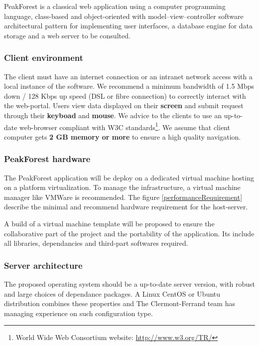 PeakForest is a classical web application using a computer programming language, class-based and object-oriented with model–view–controller software architectural pattern for implementing user interfaces, a database engine for data storage and a web server to be consulted.


\subsubsection{Client environment}

The client must have an internet connection or an intranet network access with a local instance of the software. We recommend a minimum bandwidth of 1.5 Mbps down / 128 Kbps up speed (DSL or fibre connection) to correctly interact with the web-portal. Users view data displayed on their \textbf{screen} and submit request through their \textbf{keyboad} and \textbf{mouse}.
We advice to the clients to use an up-to-date web-browser compliant with W3C standards\footnote{World Wide Web Consortium website: \url{http://www.w3.org/TR/}}. We assume that client computer gets \textbf{2 GB memory or more} to ensure a high quality navigation.\\


\subsubsection{PeakForest hardware}

The PeakForest application will be deploy on a dedicated virtual machine hosting on a platform virtualization. To manage the infrastructure, a virtual machine manager like VMWare is recommended. The figure \ref{performanceRequirement} describe the minimal and recommend hardware requirement for the host-server.



A build of a virtual machine template will be proposed to ensure the collaborative part of the project and the portability of the application. Its include all libraries, dependancies and third-part softwares required.


\subsubsection{Server architecture}

The proposed operating system should be a up-to-date server version, with robust and large choices of dependance packages. A Linux CentOS or Ubuntu distribution combines these  properties and The Clermont-Ferrand team has managing experience on such configuration type. 

